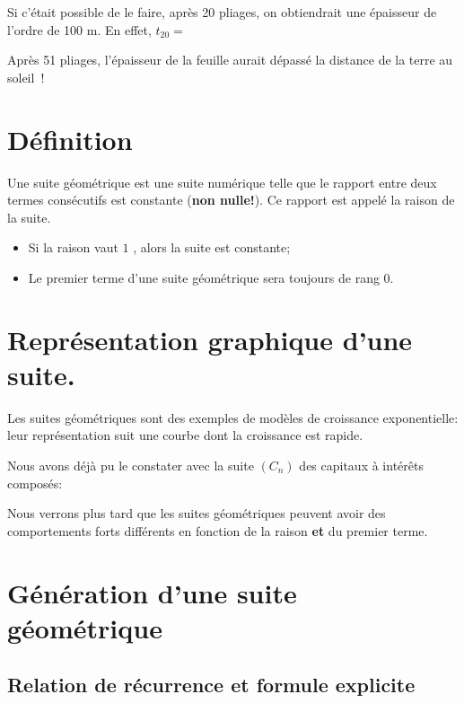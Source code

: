 \documentclass[a4paper,12pt]{report}
\begin{document}
Si c’était possible de le faire, après 20 pliages, on obtiendrait une épaisseur de l’ordre de 100 m.
En effet, \(t_{20}=\) \dotfill

Après 51 pliages, l’épaisseur de la feuille aurait dépassé la distance
de la terre au soleil !

\section{Définition}
\label{sec:org11de80d}

\begin{definition}
Une suite géométrique est une suite numérique telle que le rapport
entre deux termes consécutifs est constante (\textbf{non nulle!}). Ce
rapport est appelé la raison de la suite.
\end{definition}

\begin{remarque}
\begin{itemize}
\item Si la raison vaut \(1\) , alors la suite est constante;
\item Le premier terme d'une suite géométrique sera toujours de rang \(0\).
\end{itemize}
\end{remarque}

\section{Représentation graphique d'une suite.}
\label{sec:org510f203}
Les suites géométriques sont des exemples de modèles de croissance
exponentielle: leur représentation suit une courbe dont la croissance
est rapide.

Nous avons déjà pu le constater avec la suite \((C_n)\) des capitaux à
intérêts composés:

\begin{center}

\end{center}

Nous verrons plus tard que les suites géométriques peuvent avoir des
comportements forts différents en fonction de la raison \textbf{et} du
premier terme.
\section{Génération d'une suite géométrique}
\label{sec:orge9783fa}

\subsection{Relation de récurrence et formule explicite}
\label{sec:org68af152}
\end{document}
